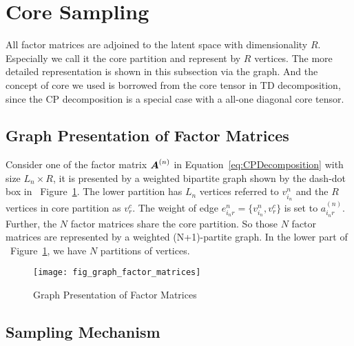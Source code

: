 \documentclass[letterpaper]{article}
\newcommand{\M}[1]{{\bm{{\MakeUppercase{#1}}}}}
\newcommand{\Mn}[2]{\M{#1}^{(#2)}}
\newcommand{\Eqn}[1]   {Equation~\ref{eq:#1}}
\newcommand{\Fig}[1]   {Figure~\ref{fig:#1}}
\begin{document}
\section{Core Sampling}
All factor matrices are adjoined to the latent space with dimensionality $R$.
Especially we call it the core partition and represent by $R$ vertices.
The more detailed representation is shown in this subsection via the graph.
And the concept of core we used is borrowed from the core tensor in TD decomposition,
since the CP decomposition is a special case with a all-one diagonal core tensor.

\subsection{Graph Presentation of Factor Matrices}
Consider one of the factor matrix $\Mn{A}{n}$ in \Eqn{CPDecomposition}
with size $L_n \times R$,
it is presented by a weighted bipartite graph shown by the dash-dot box in ~\Fig{GraphMatrices}.
The lower partition has $L_n$ vertices referred to $v^n_{i_n}$
and the $R$ vertices in core partition as $v^c_r$.
The weight of edge $e^n_{i_nr} = \{v^{n}_{i_n},v^c_r\}$ is set to $a^{(n)}_{i_nr}$.
Further, the $N$ factor matrices share the core partition.
So those $N$ factor matrices are represented by a weighted (N+1)-partite graph.
In the lower part of ~\Fig{GraphMatrices}, we have $N$ partitions of vertices.
\begin{figure}[t]
  \centering
  \texttt{[image: fig\_graph\_factor\_matrices]}\\
  \caption{Graph Presentation of Factor Matrices}
  \label{fig:GraphMatrices}
\end{figure}
\subsection{Sampling Mechanism}
\end{document}
